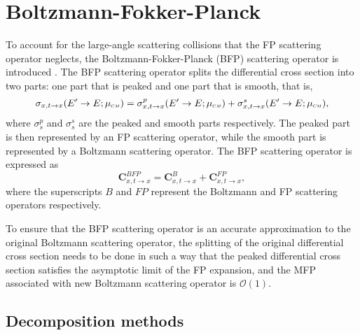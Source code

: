 \section{Boltzmann-Fokker-Planck}
To account for the large-angle scattering collisions that the FP scattering operator neglects, the Boltzmann-Fokker-Planck (BFP) scattering operator is introduced \cite{Ligou-1986}. The BFP scattering operator splits the differential cross section into two parts: one part that is peaked and one part that is smooth, that is,
\begin{equation}
    \sigma_{x,t \rightarrow x}(E^{\prime} \rightarrow E; \mucm) = \sigma_{x,t \rightarrow x}^{p}(E^{\prime} \rightarrow E; \mucm) + \sigma_{x,t \rightarrow x}^{s}(E^{\prime} \rightarrow E; \mucm),
\end{equation}
where $\sigma_s^{p}$ and $\sigma_s^{s}$ are the peaked and smooth parts respectively. The peaked part is then represented by an FP scattering operator, while the smooth part is represented by a Boltzmann scattering operator. The BFP scattering operator is expressed as
\begin{equation} \label{eqn:BFP-operator}
    \boldsymbol{C}_{x,t \rightarrow x}^{BFP} = \boldsymbol{C}_{x,t \rightarrow x}^{B} + \boldsymbol{C}_{x,t \rightarrow x}^{FP},
\end{equation}
where the superscripts $B$ and $FP$ represent the Boltzmann and FP scattering operators respectively.

To ensure that the BFP scattering operator is an accurate approximation to the original Boltzmann scattering operator, the splitting of the original differential cross section needs to be done in such a way that the peaked differential cross section satisfies the asymptotic limit of the FP expansion, and the MFP associated with new Boltzmann scattering operator is $\mathcal{O}(1)$.

\subsection{Decomposition methods}
